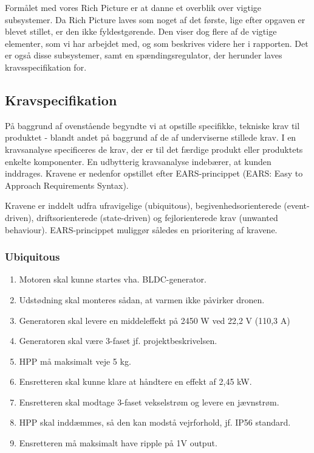 Formålet med vores Rich Picture er at danne et overblik over vigtige subsystemer. Da Rich Picture laves som noget af det første, lige efter opgaven er blevet stillet, er den ikke fyldestgørende. Den viser dog flere af de vigtige elementer, som vi har arbejdet med, og som beskrives videre her i rapporten. Det er også disse subsystemer, samt en spændingsregulator, der herunder laves kravsspecifikation for.

\subsection{Kravspecifikation}
\label{sec:kravspecifikation}

På baggrund af ovenstående begyndte vi at opstille specifikke, tekniske krav til produktet - blandt andet på baggrund af de af underviserne stillede krav. I en kravsanalyse specificeres de krav, der er til det færdige produkt eller produktets enkelte komponenter. En udbytterig kravsanalyse indebærer, at kunden inddrages. Kravene er nedenfor opstillet efter EARS-princippet (EARS: Easy to Approach Requirements Syntax).

Kravene er inddelt udfra ufravigelige (ubiquitous), begivenhedsorienterede (event-driven), driftsorienterede (state-driven) og fejlorienterede krav (unwanted behaviour). EARS-princippet muliggør således en prioritering af kravene.

\subsubsection{Ubiquitous}
\label{sec:kravspecifikation-1}

\begin{enumerate}[label=2.1.1.\arabic*]
\item Motoren skal kunne startes vha. BLDC-generator.
\item Udstødning skal monteres sådan, at varmen ikke påvirker dronen.
\item Generatoren skal levere en middeleffekt på 2450 W ved 22,2 V (110,3 A)
\item Generatoren skal være 3-faset jf. projektbeskrivelsen.
\item HPP må maksimalt veje 5 kg.
\item Ensretteren skal kunne klare at håndtere en effekt af 2,45 kW.
\item Ensretteren skal modtage 3-faset vekselstrøm og levere en jævnstrøm.
\item HPP skal inddæmmes, så den kan modstå vejrforhold, jf. IP56 standard.
\item Ensretteren må maksimalt have ripple på 1V output.
\end{enumerate}


